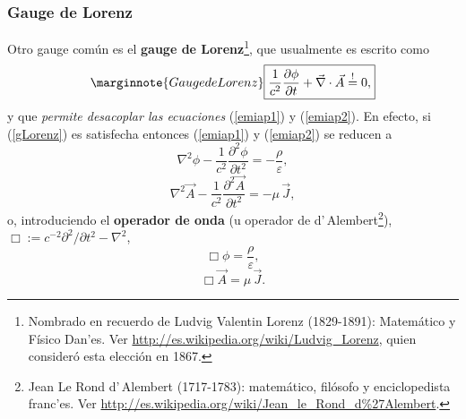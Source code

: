 \subsubsection{Gauge de Lorenz}
Otro gauge común es el \textbf{gauge de Lorenz}\footnote{Nombrado en recuerdo de Ludvig Valentin Lorenz (1829-1891): Matemático y Físico Dan'es. Ver \url{http://es.wikipedia.org/wiki/Ludvig_Lorenz}, quien consideró esta elección en 1867.}, que usualmente es escrito como
\begin{equation}\marginnote{Gauge de Lorenz}\label{gLorenz}
\boxed{\frac{1}{c^2}\frac{\partial\phi}{\partial t}+\vec{\nabla}\cdot\vec{A}\stackrel{!}{=}0,}
\end{equation}
y que \textit{permite desacoplar las ecuaciones} (\ref{emiap1}) y (\ref{emiap2}).
En efecto, si (\ref{gLorenz}) es satisfecha entonces (\ref{emiap1}) y (\ref{emiap2}) se reducen a
\begin{equation}\label{emiap1gL}
 \nabla^2\phi-\frac{1}{c^2}\frac{\partial^2\phi}{\partial t^2}=-\frac{\rho}{\varepsilon},
\end{equation}
\begin{equation}\label{emiap2gL}
 \nabla^2\vec{A}-\frac{1}{c^2}\frac{\partial^2\vec{A}}{\partial t^2}=-\mu\,\vec{J},
\end{equation}
o, introduciendo el \textbf{operador de onda} (u operador de  d'\,Alembert\footnote{Jean Le Rond d'\,Alembert (1717-1783): matemático, filósofo y enciclopedista franc'es. Ver \url{http://es.wikipedia.org/wiki/Jean_le_Rond_d\%27Alembert}.}), 
$\Box:= c^{-2}{\partial^2}/{\partial t^2}-\nabla^2$,
\begin{equation}\label{emiap1gL2}
 \Box\phi=\frac{\rho}{\varepsilon},
\end{equation}
\begin{equation}\label{emiap2gL2}
 \Box\vec{A}=\mu\,\vec{J}.
\end{equation}

